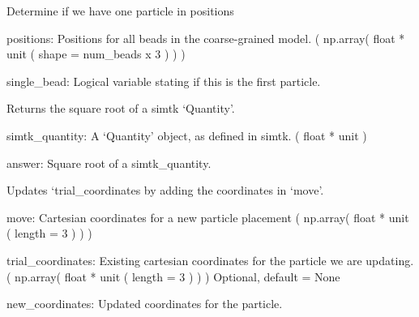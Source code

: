 \documentclass[letterpaper,12pt,english,openany,twoside]{sphinxmanual}
\begin{document}

\begin{fulllineitems}
\label{\detokenize{util:util.single_bead}}
Determine if we have one particle in positions

positions: Positions for all beads in the coarse-grained model.
( np.array( float * unit ( shape = num\_beads x 3 ) ) )

single\_bead: Logical variable stating if this is the first particle.

\end{fulllineitems}


\begin{fulllineitems}
\label{\detokenize{util:util.unit_sqrt}}
Returns the square root of a simtk ‘Quantity’.

simtk\_quantity: A ‘Quantity’ object, as defined in simtk.
( float * unit )

answer: Square root of a simtk\_quantity.

\end{fulllineitems}


\begin{fulllineitems}
\label{\detokenize{util:util.update_trial_coordinates}}
Updates ‘trial\_coordinates by adding the coordinates in ‘move’.

move: Cartesian coordinates for a new particle placement
( np.array( float * unit ( length = 3 ) ) )

trial\_coordinates: Existing cartesian coordinates for the particle
we are updating.
( np.array( float * unit ( length = 3 ) ) )
Optional, default = None

new\_coordinates: Updated coordinates for the particle.

\end{fulllineitems}
\end{document}
